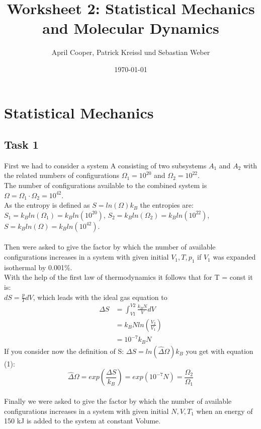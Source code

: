 \documentclass[12pt,a4paper]{scrartcl}
\author{April Cooper, Patrick Kreissl und Sebastian Weber}
\title{Worksheet 2: Statistical Mechanics and Molecular Dynamics}
\date{\today}
\begin{document}
\maketitle
\tableofcontents
\newpage

\section{Statistical Mechanics}
\subsection{Task 1}
First we had to consider a system A consisting of two subsystems $A_1$ and $A_2$ with the related numbers of configurations $\Omega_1= 10^20$ and $\Omega_2=10^22$.\\
The number of configurations available to the combined system  is $\Omega=\Omega_1\cdot \Omega_2= 10^{42}$.\\
As the entropy is defined as $S = ln(\Omega)k_B$ the entropies are:\\
$S_1=k_B ln(\Omega_1)=k_B ln(10^{20})$,
$S_2=k_B ln(\Omega_2)=k_B ln(10^{22})$,
$S=k_B ln(\Omega)=k_B ln(10^{42})$.\\
\\
Then were asked to give the factor by which the number of available configurations increases in a system with given initial $V_1,T,p_1$ if $V_1$ was expanded isothermal by 0.001\%.
\\
With the help of the first law of thermodynamics  it follows that for T = const it is:\\
$dS=\frac{p}{T}dV$, which leads with the ideal gas equation to
 \begin{align}
 \Delta S&=\int_{V1}^{V2} \frac{k_BN}{V}dV\nonumber\\
  &= k_BNln\left(\frac{V_2}{V_1}\right)\nonumber\\
  &=10^{-7}k_BN
   \end{align}
  If you consider now the definition of S: $\Delta S = ln( \hat \Delta \Omega)k_B $ you get with equation (1):\\
 \[ \hat \Delta\Omega = exp(\frac{\Delta S}{k_B}) = exp(10^{-7}N)=\frac{\Omega_2}{\Omega_1}\]
 \\
 Finally we were asked to give the factor by which the number of available configurations increases in a system with given initial $N,V,T_1$ when an energy of 150 kJ is  added to the system at constant Volume.\\
\end{document}
